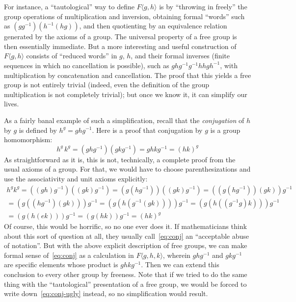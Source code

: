 \documentclass[12pt]{article}
\numberwithin{equation}{section}
\begin{document}
For instance, a ``tautological'' way to define $F\langle g,h\rangle$ is by ``throwing in freely'' the group operations of multiplication and inversion, obtaining formal ``words'' such as $(gg^{-1})(h^{-1}(h g))$, and then quotienting by an equivalence relation generated by the axioms of a group.
The universal property of a free group is then essentially immediate.
But a more interesting and useful construction of $F\langle g,h\rangle$ consists of ``reduced words'' in $g$, $h$, and their formal inverses (finite sequences in which no cancellation is possible), such as $g h g^{-1} g^{-1} h h g h^{-1}$, with multiplication by concatenation and cancellation.
The proof that this yields a free group is not entirely trivial (indeed, even the definition of the group multiplication is not completely trivial); but once we know it, it can simplify our lives.

As a fairly banal example of such a simplification, recall that the \emph{conjugation} of $h$ by $g$ is defined by $h^g = g h g^{-1}$.
Here is a proof that conjugation by $g$ is a group homomorphism:
\begin{equation}
  h^g\,k^g = (g h g^{-1})(g k g^{-1}) = g h k g^{-1} = (hk)^g\label{eq:conj}
\end{equation}
As straightforward as it is, this is not, technically, a complete proof from the usual axioms of a group.
For that, we would have to choose parenthesizations and use the associativity and unit axioms explicitly:
\begin{multline}\label{eq:conj-ugly}
  h^g k^g
  = ((g h) g^{-1})((g k) g^{-1})
  = (g (h g^{-1}))((g k) g^{-1})
  = ((g (h g^{-1}))(g k)) g^{-1}\\
  = (g ((h g^{-1})(g k))) g^{-1}
  = (g (h (g^{-1}(g k)))) g^{-1}
  = (g (h ((g^{-1} g) k))) g^{-1}\\
  = (g (h (e k))) g^{-1}
  = (g (h k)) g^{-1}
  = (h k)^g
\end{multline}
Of course, this would be horrific, so no one ever does it.
If mathematicians think about this sort of question at all, they usually call~\eqref{eq:conj} an ``acceptable abuse of notation''.
But with the above explicit description of free groups, we can make formal sense of~\eqref{eq:conj} as a calculation in $F\langle g,h,k\rangle$, wherein $g h g^{-1}$ and $g k g^{-1}$ are specific elements whose product is $g h k g^{-1}$.
Then we can extend this conclusion to every other group by freeness.
Note that if we tried to do the same thing with the ``tautological'' presentation of a free group, we would be forced to write down~\eqref{eq:conj-ugly} instead, so no simplification would result.
\end{document}
